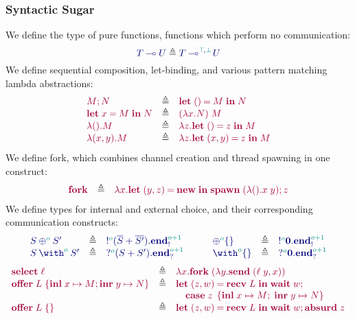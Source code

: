 \documentclass[main.tex]{subfiles}
\begin{document}
\subsubsection{Syntactic Sugar}%
\label{sec:pgv-syntax-sugar}
We define the type of pure functions, \ie functions which perform no communication:
\[
  \ty{\tylolli{T}{U}} \elabarrow \ty{\tylolli[\cs{\ptop},\cs{\pbot}]{T}{U}}
\]
We define sequential composition, let-binding, and various pattern matching lambda abstractions:
\[
\begin{array}{lcl}
  \tm{\andthen{M}{N}}
  & \elabarrow & \tm{\letunit{M}{N}} \\
  \tm{\letbind{x}{M}{N}}
  & \elabarrow & \tm{(\lambda x.N)\;M} \\
  \tm{\lambda\unit.M}
  & \elabarrow & \tm{\lambda z.\letunit{z}{M}} \\
  \tm{\lambda\pair{x}{y}.M}
  & \elabarrow & \tm{\lambda z.\letpair{x}{y}{z}{M}}
\end{array}
\]
We define fork, which combines channel creation and thread spawning in one construct:
\[
\begin{array}{lcl}
  \tm{\fork}
  & \elabarrow & \tm{\lambda x.\letpair{y}{z}{\new}{\andthen{\spawn\;{(\lambda\unit.x\;y)}}{z}}}
\end{array}
\]
We define types for internal and external choice, and their corresponding communication constructs:
\[
\begin{array}{lcl}
  \ty{\tyselect[\cs{o}]{S}{S'}}
  & \elabarrow & \ty{\tysend[\cs{o}]{(\tysum{\co{S}}{\co{S'}})}{\tyends[\cs{o+1}]}} \\
  \ty{\tyoffer[\cs{o}]{S}{S'}}
  & \elabarrow & \ty{\tyrecv[\cs{o}]{(\tysum{S}{S'})}{\tyendr[\cs{o+1}]}}
\end{array}
\qquad
\begin{array}{lcl}
  \ty{\tyselectemp[\cs{o}]}
  & \elabarrow & \ty{\tysend[\cs{o}]{\tyvoid}{\tyends[\cs{o+1}]}} \\
  \ty{\tyofferemp[\cs{o}]}
  & \elabarrow & \ty{\tyrecv[\cs{o}]{\tyvoid}{\tyendr[\cs{o+1}]}} \\
\end{array}
\]
\[
\begin{array}{lcl}
  \tm{\select{\ell}}
  & \elabarrow & \tm{\lambda x.\fork\;{(\lambda y.\send\;{\pair{\ell\;y}{x}})}} \\
  \tm{\offer{L}{x}{M}{y}{N}}
  & \elabarrow & \tm{\letpair{z}{w}{\recv\;{L}}{\wait\;{w};}} \\
  &            & \quad\tm{\casesum{z}{x}{M}{y}{N}} \\
  \tm{\offeremp{L}}
  & \elabarrow & \tm{\letpair{z}{w}{\recv\;L}{\andthen{\wait\;{w}}{\absurd{z}}}}
\end{array}
\]
\end{document}
